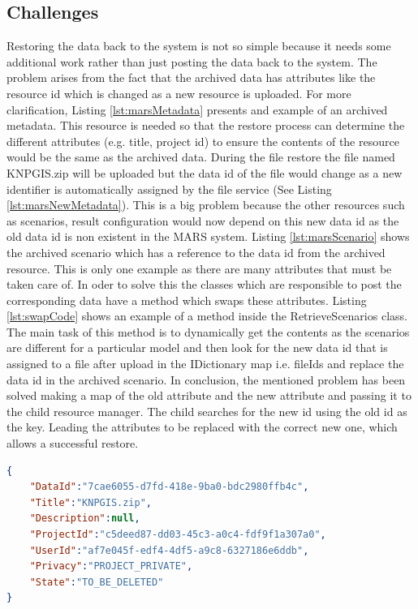 \subsection{Challenges}
\label{subsec:restoreProb}
Restoring the data back to the system is not so simple because it needs some additional work rather than just posting the data back to the system. 
The problem arises from the fact that the archived data has attributes like the resource id which is changed as a new resource is uploaded. For more clarification, 
Listing \ref{lst:marsMetadata} presents and example of an archived metadata. This resource is needed so that the restore process can determine the different 
attributes (e.g. title, project id) to ensure the contents of the resource would be the same as the archived data. During the file restore 
the file named KNPGIS.zip will 
be uploaded but the data id of the file would change as a new identifier is automatically assigned by the file service (See Listing \ref{lst:marsNewMetadata}). 
This is a big problem because the other 
resources such as scenarios, result configuration would now
depend on this new data id as the old data id is non existent in the MARS system. Listing \ref{lst:marsScenario} shows the archived scenario which has a reference 
to the data id from the archived resource. 
This is only one example as there are many attributes that must be taken care of. In oder to solve this the classes which are responsible
to post the corresponding data have a method which swaps these attributes. Listing \ref{lst:swapCode} shows an example of a method inside the RetrieveScenarios class.
The main task of this method is to dynamically get the contents as the scenarios are different for a particular model and then look for the new data id
that is assigned to a file after upload in the IDictionary map i.e. fileIds and replace the data id in the archived scenario. In conclusion, the mentioned problem
has been solved making a map of the old attribute and the new attribute and passing it to the child resource manager. The child searches for the new id using the 
old id as the key. Leading the attributes to be replaced with the correct new one, which allows a successful restore.

\newpage
\begin{lstlisting}[caption={Snippet of archived MARS metadata resource}, language=json,firstnumber=1, captionpos=b, label={lst:marsMetadata}]
{
    "DataId":"7cae6055-d7fd-418e-9ba0-bdc2980ffb4c",
    "Title":"KNPGIS.zip",
    "Description":null,
    "ProjectId":"c5deed87-dd03-45c3-a0c4-fdf9f1a307a0",
    "UserId":"af7e045f-edf4-4df5-a9c8-6327186e6ddb",
    "Privacy":"PROJECT_PRIVATE",
    "State":"TO_BE_DELETED"
}
\end{lstlisting}

